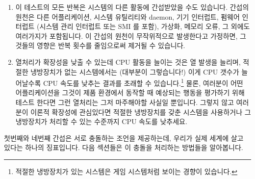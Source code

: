 \begin{enumerate}
\item	이 테스트의 모든 반복은 시스템의 다른 활동에 간섭받았을 수도 있습니다.
	간섭의 원천은 다른 어플리케이션, 시스템 유틸리티와 daemon, 기기
	인터럽트, 펌웨어 인터럽트 (시스템 관리 인터럽트 또는 SMI 를 포함),
	가상화, 메모리 오류, 그 외에도 여러가지가 포함됩니다.
	이 간섭의 원천이 무작위적으로 발생한다고 가정하면, 그것들의 영향은 반복
	횟수를 줄임으로써 제거될 수 있습니다.
\item	열처리가 확장성을 낮출 수 있는데 CPU 활동을 늘이는 것은 열 발생을
	늘리며, 적절한 냉방장치가 없는 시스템에서는 (대부분이 그렇습니다!) 이게
	CPU 갯수가 늘어날수록 CPU 속도를 낮추는 결과를 초래할 수
	있습니다.\footnote{
		적절한 냉방장치가 있는 시스템은 게임 시스템처럼 보이는 경향이
		있습니다.}
	물론, 여러분이 어떤 어플리케이션을 그것이 제품 환경에서 동작할 때
	예상되는 행동을 평가하기 위해 테스트 한다면 그런 열처리는 그저
	마주해야할 사실일 뿐입니다.
	그렇지 않고 여러분이 이론적 확장성에 관심있다면 적절한 냉방장치를 갖춘
	시스템을 사용하거나 그 냉방장치가 처리할 수 있는 수준까지 CPU 속도를
	낮추세요.

\end{enumerate}

첫번째와 네번째 간섭은 서로 충돌하는 조언을 제공하는데, 우리가 실제 세계에 살고
있다는 하나의 징표입니다.
다음 섹션들은 이 충돌을 처리하는 방법들을 알아봅니다.

